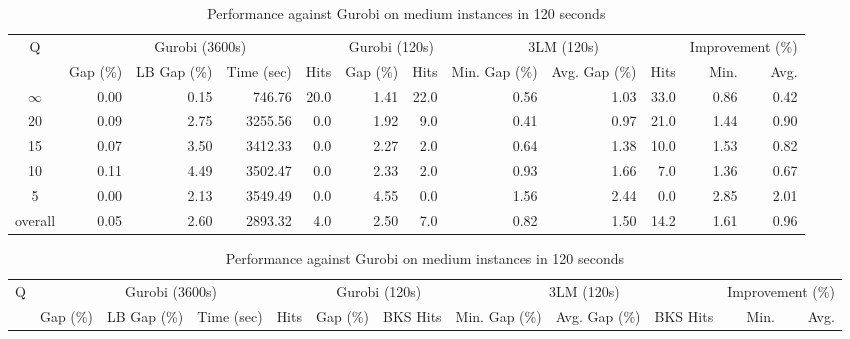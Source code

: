 \begin{table}[H]
\centering
\caption{Performance against Gurobi on medium instances in 120 seconds}
\label{tab:3lm_resuts150T120}
\begin{tabular}{c rrrr rr rrr rr}
\toprule
       Q & \multicolumn{4}{c}{Gurobi (3600s)} & \multicolumn{2}{c}{Gurobi (120s)} & \multicolumn{3}{c}{3LM (120s)} & \multicolumn{2}{c}{Improvement (\%)} \\
         &       Gap (\%) & LB Gap (\%) & Time (sec) & Hits &      Gap (\%) & Hits & Min. Gap (\%) & Avg. Gap (\%) & Hits &             Min. & Avg. \\
\cmidrule(lr){1-1} \cmidrule(lr){2-5} \cmidrule(lr){2-5} \cmidrule(lr){6-7} \cmidrule(lr){8-10} \cmidrule(lr){11-12}
$\infty$ &           0.00 &        0.15 &     746.76 & 20.0 &          1.41 & 22.0 &          0.56 &          1.03 & 33.0 &             0.86 & 0.42 \\
      20 &           0.09 &        2.75 &    3255.56 &  0.0 &          1.92 &  9.0 &          0.41 &          0.97 & 21.0 &             1.44 & 0.90 \\
      15 &           0.07 &        3.50 &    3412.33 &  0.0 &          2.27 &  2.0 &          0.64 &          1.38 & 10.0 &             1.53 & 0.82 \\
      10 &           0.11 &        4.49 &    3502.47 &  0.0 &          2.33 &  2.0 &          0.93 &          1.66 &  7.0 &             1.36 & 0.67 \\
       5 &           0.00 &        2.13 &    3549.49 &  0.0 &          4.55 &  0.0 &          1.56 &          2.44 &  0.0 &             2.85 & 2.01 \\
\midrule
 overall &           0.05 &        2.60 &    2893.32 &  4.0 &          2.50 &  7.0 &          0.82 &          1.50 & 14.2 &             1.61 & 0.96 \\
\bottomrule
\end{tabular}
\end{table}\begin{table}[H]
\centering
\caption{Performance against Gurobi on medium instances in 120 seconds}
\label{tab:3lm_resuts150T120}
\begin{tabular}{c rrrr rr rrr rr}
\toprule
       Q & \multicolumn{4}{c}{Gurobi (3600s)} & \multicolumn{2}{c}{Gurobi (120s)} & \multicolumn{3}{c}{3LM (120s)} & \multicolumn{2}{c}{Improvement (\%)} \\
         &       Gap (\%) & LB Gap (\%) & Time (sec) & Hits &      Gap (\%) & BKS Hits & Min. Gap (\%) & Avg. Gap (\%) & BKS Hits &             Min. & Avg. \\

\end{tabular}
\end{table}
